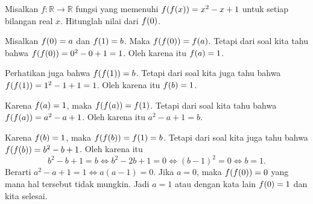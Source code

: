 	\begin{contoh}
		Misalkan $ f : \mathbb{R} \to \mathbb{R} $ fungsi yang memenuhi $ \mathop{}\!{f}{\left({\mathop{}\!{f}{\left({x}\right)}}\right)} = x^{2} - x + 1 $ untuk setiap bilangan real $ x $. Hitunglah nilai dari $ \mathop{}\!{f}{\left({0}\right)} $.
	\end{contoh}
	\begin{jawab}
		Misalkan $ \mathop{}\!{f}{\left({0}\right)} = a $ dan $ \mathop{}\!{f}{\left({1}\right)} = b $. Maka $ \mathop{}\!{f}{\left({\mathop{}\!{f}{\left({0}\right)}}\right)} = \mathop{}\!{f}{\left({a}\right)} $. Tetapi dari soal kita tahu bahwa $ \mathop{}\!{f}{\left({\mathop{}\!{f}{\left({0}\right)}}\right)} = 0^{2} - 0 + 1 = 1 $. Oleh karena itu $ \mathop{}\!{f}{\left({a}\right)} = 1 $.
		\par Perhatikan juga bahwa $ \mathop{}\!{f}{\left({\mathop{}\!{f}{\left({1}\right)}}\right)} = b $. Tetapi dari soal kita juga tahu bahwa $ \mathop{}\!{f}{\left({\mathop{}\!{f}{\left({1}\right)}}\right)} = 1^{2} - 1 + 1 = 1 $. Oleh karena itu $ \mathop{}\!{f}{\left({b}\right)} = 1 $.
		\par Karena $ \mathop{}\!{f}{\left({a}\right)} = 1 $, maka $ \mathop{}\!{f}{\left({\mathop{}\!{f}{\left({a}\right)}}\right)} = \mathop{}\!{f}{\left({1}\right)} $. Tetapi dari soal kita tahu bahwa $ \mathop{}\!{f}{\left({\mathop{}\!{f}{\left({a}\right)}}\right)} = a^{2} - a + 1 $. Oleh karena itu $ a^{2} - a + 1 = b $.
		\par Karena $ \mathop{}\!{f}{\left({b}\right)} = 1 $, maka $ \mathop{}\!{f}{\left({\mathop{}\!{f}{\left({b}\right)}}\right)} = \mathop{}\!{f}{\left({1}\right)} = b $. Tetapi dari soal kita juga tahu bahwa $ \mathop{}\!{f}{\left({\mathop{}\!{f}{\left({b}\right)}}\right)} = b^{2} - b + 1 $. Oleh karena itu
		\[ b^{2} - b + 1 = b \iff b^{2} - 2b + 1 = 0 \iff \left(b - 1\right)^{2} = 0 \iff b = 1. \]
		Berarti $ a^{2} - a + 1 = 1 \iff a\left(a - 1\right) = 0 $. Jika $ a = 0 $, maka $ \mathop{}\!{f}{\left({\mathop{}\!{f}{\left({0}\right)}}\right)} = 0 $ yang mana hal tersebut tidak mungkin. Jadi $ a = 1 $ atau dengan kata lain $ \mathop{}\!{f}{\left({0}\right)} = 1 $ dan kita selesai.
	\end{jawab}
	

